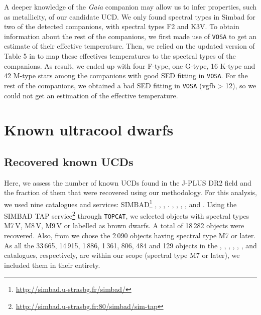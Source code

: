 A deeper knowledge of the \textit{Gaia} companion may allow us to infer properties, such as metallicity, of our candidate UCD. We only found spectral types in Simbad for two of the detected companions, with spectral types F2 and K3V. To obtain information about the rest of the companions, we first made use of \texttt{VOSA} to get an estimate of their effective temperature. Then, we relied on the updated version of Table 5 in \citet{pecaut2013} to map these effectives temperatures to the spectral types of the companions. As result, we ended up with four F-type, one G-type, 16 K-type and 42 M-type stars among the companions with good SED fitting in \texttt{VOSA}. For the rest of the companions, we obtained a bad SED fitting in \texttt{VOSA} (vgfb > 12), so we could not get an estimation of the effective temperature.



\section{Known ultracool dwarfs} \label{known}

\subsection{Recovered known UCDs} \label{recovered_known}

Here, we assess the number of known UCDs found in the J-PLUS DR2 field and the fraction of them that were recovered using our methodology. For this analysis, we used nine catalogues and services: SIMBAD\footnote{\url{http://simbad.u-strasbg.fr/simbad/}} \citep{Wenger00}, \citet{zhang2009}, \citet{zhang2010}, \citet{schmidt2010}. \citet{skrzypek2016}, \citet{smart2017}, \citet{Reyle2018}, \citet{panstarrs1}, and \citet{ahmed2019}. Using the SIMBAD TAP service\footnote{\url{http://simbad.u-strasbg.fr:80/simbad/sim-tap}} through \texttt{TOPCAT}, we selected objects with spectral types M7\,V, M8\,V, M9\,V or labelled as brown dwarfs. A total of 18\,282 objects were recovered. Also, from \citet{panstarrs1} we chose the 2\,090 objects having spectral type M7 or later. As all the 33\,665, 14\,915, 1\,886, 1\,361, 806, 484 and 129 objects in the \citet{ahmed2019}, \citet{Reyle2018}, \citet{smart2017}, \citet{skrzypek2016}, \citet{zhang2010}, \citet{schmidt2010}, and \citet{zhang2009} catalogues, respectively, are within our scope (spectral type M7 or later), we included them in their entirety.

